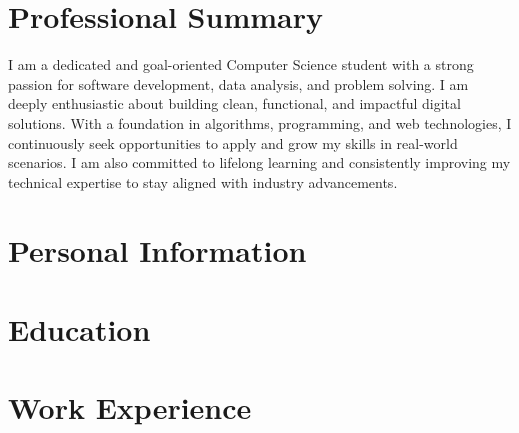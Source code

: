 \documentclass[11pt,a4paper,sans]{moderncv}
\title
\begin{document}
\makecvtitle

\section*{Professional Summary}
I am a dedicated and goal-oriented Computer Science student with a strong passion for software development, data analysis, and problem solving. I am deeply enthusiastic about building clean, functional, and impactful digital solutions. With a foundation in algorithms, programming, and web technologies, I continuously seek opportunities to apply and grow my skills in real-world scenarios. I am also committed to lifelong learning and consistently improving my technical expertise to stay aligned with industry advancements.

\section{Personal Information}

\section{Education}

\section{Work Experience}
\end{document}

